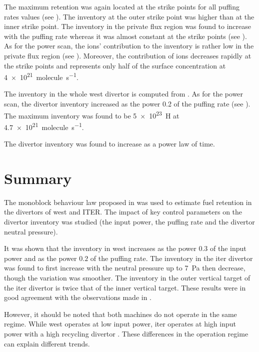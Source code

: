 The maximum \gls{retention} was again located at the \glspl{strike point} for all puffing rates values (see ).
The \gls{inventory} at the outer strike point was higher than at the inner strike point.
The \gls{inventory} in the \gls{private flux region} was found to increase with the puffing rate whereas it was almost constant at the \glspl{strike point} (see ).
As for the power scan, the ions' contribution to the \gls{inventory} is rather low in the \gls{private flux region} (see ).
Moreover, the contribution of ions decreases rapidly at the \glspl{strike point} and represents only half of the surface concentration at \SI{4e21}{molecule.s^{-1}}.

The \gls{inventory} in the whole \gls{west} \gls{divertor} is computed from .
As for the power scan, the \gls{divertor} \gls{inventory} increased as the power 0.2 of the puffing rate (see ).
The maximum \gls{inventory} was found to be \SI{5e23}{H} at \SI{4.7e21}{molecule.s^{-1}}.

The \gls{divertor} \gls{inventory} was found to increase as a power law of time.

\section{Summary}


The \gls{monoblock} behaviour law proposed in  was used to estimate fuel \gls{retention} in the \glspl{divertor} of \gls{west} and ITER.
The impact of key control parameters on the \gls{divertor} \gls{inventory} was studied (the input power, the puffing rate and the \gls{divertor} neutral pressure).

It was shown that the \gls{inventory} in \gls{west} increases as the power $0.3$ of the input power and as the power $0.2$ of the puffing rate.
The \gls{inventory} in the \gls{iter} \gls{divertor} was found to first increase with the neutral pressure up to \SI{7}{Pa} then decrease, though the variation was smoother.
The \gls{inventory} in the outer vertical target of the \gls{iter} \gls{divertor} is twice that of the inner vertical target.
These results were in good agreement with the observations made in .

However, it should be noted that both machines do not operate in the same regime.
While \gls{west} operates at low input power, \gls{iter} operates at high input power with a high recycling \gls{divertor} .
These differences in the operation regime can explain different trends.

